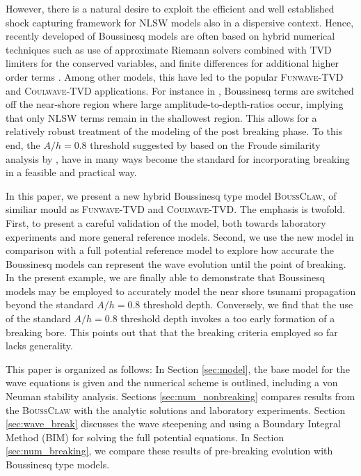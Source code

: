 \documentclass[review]{elsarticle}
\newcommand{\BoussClaw}{\textsc{BoussClaw} }
\newcommand{\BoussClawt}{\textsc{BoussClaw}}
\begin{document}
However, there is a natural desire to exploit the efficient and well established shock capturing framework for NLSW models also in a dispersive context.
Hence, recently developed of  Boussinesq models are often based on hybrid numerical techniques
such as use of approximate Riemann solvers combined with TVD limiters for the conserved variables, and finite differences
for additional higher order terms \citep{Erduran2005,Kim2009,Shiach:2009,Roeber:2010,Dutykh:2011,shi2012high}. Among other models, this have led to the popular
\textsc{Funwave-TVD} and \textsc{Coulwave-TVD} applications. For instance in \citet{shi2012high}, Boussinesq terms are 
switched off the near-shore region where large amplitude-to-depth-ratios occur,
implying that only NLSW terms remain in the shallowest region.
This allows for a relatively robust treatment of the modeling of the post breaking phase. To this end,
the $A/h = 0.8$ threshold suggested by \citep{shi2012high} 
based on the Froude similarity analysis by \citet{tonelli2009hybrid}, have in many ways become the standard for incorporating
breaking in a feasible and practical way.

In this paper, we present a new hybrid Boussinesq type model \BoussClawt, 
of similiar mould as \textsc{Funwave-TVD} and \textsc{Coulwave-TVD}. The emphasis is twofold.
First, to present a careful validation of the model, both towards  
laboratory experiments and more general reference models. Second, we use the new model
in comparison with a full potential reference model to explore how accurate the Boussinesq models 
can represent the wave evolution until the point of breaking. In the present example,
we are finally able to demonstrate that Boussinesq models may be employed
to accurately model the near shore tsunami propagation beyond the standard $A/h = 0.8$ threshold depth.
Conversely, we find that the use of the standard $A/h = 0.8$ threshold depth 
invokes a too early formation of a breaking bore. This points out that  
that the breaking criteria employed so far lacks generality.

This paper is organized as follows: In Section \ref{sec:model}, the base model
for the wave equations is given and the numerical scheme is outlined, including a von Neuman stability analysis. 
Sections \ref{sec:num_nonbreaking} compares results from the \BoussClaw with
the analytic solutions and laboratory experiments. 
Section \ref{sec:wave_break} discusses the wave steepening and using a Boundary Integral Method (BIM) for 
solving the full potential equations. 
In Section \ref{sec:num_breaking}, 
we compare these results of pre-breaking
evolution with Boussinesq type models.
\end{document}
